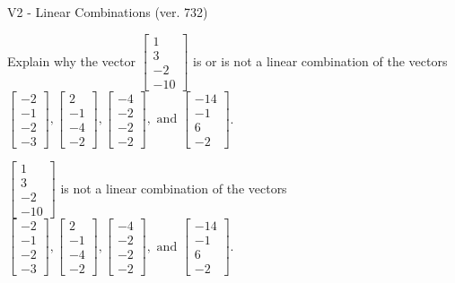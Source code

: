 \begin{exercise}
  \begin{exerciseTitle}V2 - Linear Combinations (ver. 732)\end{exerciseTitle}
  \begin{exerciseStatement}
    Explain why the vector \(\left[\begin{array}{c}
1 \\
3 \\
-2 \\
-10
\end{array}\right]\)  is or is not a linear 
	combination of the vectors \(\left[\begin{array}{c}
-2 \\
-1 \\
-2 \\
-3
\end{array}\right] , \left[\begin{array}{c}
2 \\
-1 \\
-4 \\
-2
\end{array}\right] , \left[\begin{array}{c}
-4 \\
-2 \\
-2 \\
-2
\end{array}\right] , \text{ and } \left[\begin{array}{c}
-14 \\
-1 \\
6 \\
-2
\end{array}\right]\).
	


  \end{exerciseStatement}
  \begin{exerciseAnswer}
   \(\left[\begin{array}{c}
1 \\
3 \\
-2 \\
-10
\end{array}\right]\) 
  	 is not  
	a linear combination of the vectors \(\left[\begin{array}{c}
-2 \\
-1 \\
-2 \\
-3
\end{array}\right] , \left[\begin{array}{c}
2 \\
-1 \\
-4 \\
-2
\end{array}\right] , \left[\begin{array}{c}
-4 \\
-2 \\
-2 \\
-2
\end{array}\right] , \text{ and } \left[\begin{array}{c}
-14 \\
-1 \\
6 \\
-2
\end{array}\right]\).


\end{exerciseAnswer}
\end{exercise}
